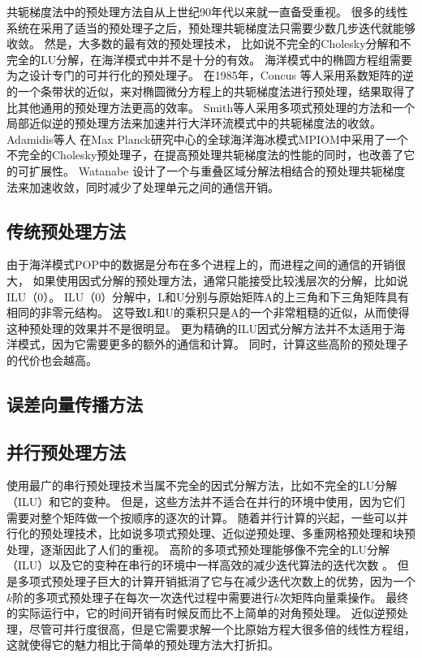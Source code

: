 共轭梯度法中的预处理方法自从上世纪90年代以来就一直备受重视。 
很多的线性系统在采用了适当的预处理子之后，预处理共轭梯度法只需要少数几步迭代就能够收敛。 
然是，大多数的最有效的预处理技术， 比如说不完全的Cholesky分解和不完全的LU分解，在海洋模式中并不是十分的有效。 
海洋模式中的椭圆方程组需要为之设计专门的可并行化的预处理子。 
在1985年，Concus 等人\cite{concus1985block}采用系数矩阵的逆的一个条带状的近似，来对椭圆微分方程上的共轭梯度法进行预处理，结果取得了比其他通用的预处理方法更高的效率。 
Smith等人\cite{smith1992parallel}采用多项式预处理的方法和一个局部近似逆的预处理方法来加速并行大洋环流模式中的共轭梯度法的收敛。 
Adamidis等人 \cite{adamidis2011high} 在Max Planck研究中心的全球海洋海冰模式MPIOM中采用了一个不完全的Cholesky预处理子，在提高预处理共轭梯度法的性能的同时，也改善了它的可扩展性。 
Watanabe \cite{Watanabe2006pcg} 设计了一个与重叠区域分解法相结合的预处理共轭梯度法来加速收敛，同时减少了处理单元之间的通信开销。 



\subsection{传统预处理方法}
\label{related:classical}

由于海洋模式POP中的数据是分布在多个进程上的，而进程之间的通信的开销很大， 如果使用因式分解的预处理方法，通常只能接受比较浅层次的分解，比如说ILU（0）。 
ILU（0）分解中，L和U分别与原始矩阵A的上三角和下三角矩阵具有相同的非零元结构。
这导致L和U的乘积只是A的一个非常粗糙的近似，从而使得这种预处理的效果并不是很明显。 
更为精确的ILU因式分解方法并不太适用于海洋模式，因为它需要更多的额外的通信和计算。 
同时，计算这些高阶的预处理子的代价也会越高。 

\subsection{误差向量传播方法}
\label{related:evp}

\subsection{并行预处理方法}
\label{related:parall}

使用最广的串行预处理技术当属不完全的因式分解方法，比如不完全的LU分解（ILU）和它的变种\cite{benzi2002preconditioning}。 
但是，这些方法并不适合在并行的环境中使用，因为它们需要对整个矩阵做一个按顺序的逐次的计算。 
随着并行计算的兴起，一些可以并行化的预处理技术，比如说多项式预处理、近似逆预处理、多重网格预处理和块预处理，逐渐因此了人们的重视。 
高阶的多项式预处理能够像不完全的LU分解（ILU）以及它的变种在串行的环境中一样高效的减少迭代算法的迭代次数\cite{benzi2002preconditioning} 。 
但是多项式预处理子巨大的计算开销抵消了它与在减少迭代次数上的优势，因为一个$k$阶的多项式预处理子在每次一次迭代过程中需要进行$k$次矩阵向量乘操作。 
最终的实际运行中，它的时间开销有时候反而比不上简单的对角预处理\cite{meyer1989numerical,smith1992parallel}。
近似逆预处理，尽管可并行度很高，但是它需要求解一个比原始方程大很多倍的线性方程组\cite{smith1992parallel,bergamaschi2007numerical}， 这就使得它的魅力相比于简单的预处理方法大打折扣。


